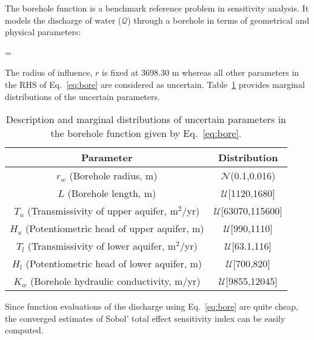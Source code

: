 The borehole function is a benchmark reference problem in sensitivity analysis. It models the discharge
of water ($\mathcal{Q}$) through a borehole in terms of geometrical and physical parameters:

\be
{} = 
\label{eq:bore}
\ee

\noindent The radius of influence, $r$ is fixed at 3698.30 m whereas all other parameters
in the RHS of Eq.~\ref{eq:bore} are considered as uncertain. Table~\ref{tab:bore} provides
marginal distributions of the uncertain parameters. 

\begin{table}[htbp]
\renewcommand*{\arraystretch}{1.2}
\begin{center}
\begin{tabular}{|c|c|}
\hline
Parameter & Distribution \\ \hline \hline
$r_w$ (Borehole radius, m) & $\mathcal{N}$(0.1,0.016) \\
$L$ (Borehole length, m) & $\mathcal{U}$[1120,1680] \\
$T_u$ (Transmissivity of upper aquifer, m$^2$/yr) & $\mathcal{U}$[63070,115600] \\
$H_u$ (Potentiometric head of upper aquifer, m) & $\mathcal{U}$[990,1110] \\
$T_l$ (Transmissivity of lower aquifer, m$^2$/yr) & $\mathcal{U}$[63.1,116] \\
$H_l$ (Potentiometric head of lower aquifer, m) & $\mathcal{U}$[700,820] \\
$K_w$ (Borehole hydraulic conductivity, m/yr) & $\mathcal{U}$[9855,12045] \\
\hline
\end{tabular}
\end{center}

\caption{Description and marginal distributions of uncertain parameters in the borehole function
given by Eq.~\ref{eq:bore}.}
\label{tab:bore}
\end{table}

Since function evaluations of the discharge using Eq.~\ref{eq:bore} are quite cheap, the converged
estimates of Sobol' total effect sensitivity index can be easily computed. 

